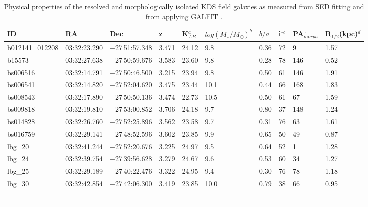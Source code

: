 \documentclass[fleqn,usenatbib]{mnras}
\begin{document}
\begin{table*}
\centering
\begin{threeparttable}
\caption{Physical properties of the resolved and morphologically isolated KDS field galaxies as measured from SED fitting and from applying {\scriptsize GALFIT} \protect\citep{Peng2010_galfit}.}
\label{tab:phys-props}
\begin{tabular}{llllllllll}


 \hline
ID              & RA       & Dec       & z     & K$_{AB}^{a}$     & $log(M_{\star}/M_{\odot})^{b}$ & $b/a$ & i$^{\circ}$$^{c}$ & PA$_{morph}^{\circ}$ & R$_{1/2}$(kpc)$^{d}$ \\
 \hline
b012141\_012208 & 03:32:23.290 & $-$27:51:57.348 & 3.471        & 24.12  & 9.8 & 0.36        & 72        & 9     & 1.57      \\
b15573          & 03:32:27.638 & $-$27:50:59.676 & 3.583        & 23.60   & 9.8  & 0.28        & 78        & 146   & 0.52      \\
bs006516        & 03:32:14.791 & $-$27:50:46.500 & 3.215        & 23.94  & 9.8 & 0.50         & 61        & 146   & 1.91      \\
bs006541        & 03:32:14.820 & $-$27:52:04.620 & 3.475       & 23.44  & 10.1  & 0.44        & 66        & 168   & 1.83      \\
bs008543        & 03:32:17.890 & $-$27:50:50.136 & 3.474        & 22.73  & 10.5 & 0.50         & 61        & 67    & 1.59      \\
bs009818        & 03:32:19.810 & $-$27:53:00.852 & 3.706        & 24.18  & 9.7  & 0.80         & 37        & 148   & 1.24      \\
bs014828        & 03:32:26.760 & $-$27:52:25.896 & 3.562        & 23.58  & 9.7  & 0.31        & 76        & 63    & 1.61      \\
bs016759        & 03:32:29.141 & $-$27:48:52.596 & 3.602       & 23.85  & 9.9   & 0.65        & 50        & 49    & 0.87      \\
lbg\_20         & 03:32:41.244 & $-$27:52:20.676 & 3.225        & 24.97  & 9.5  & 0.64        & 52        & 1     & 1.28      \\
lbg\_24         & 03:32:39.754 & $-$27:39:56.628 & 3.279       & 24.67  & 9.6   & 0.53        & 60        & 34    & 1.27      \\
lbg\_25         & 03:32:29.189 & $-$27:40:22.476 & 3.322        & 24.95  & 9.4  & 0.30         & 76        & 78    & 1.18      \\
lbg\_30         & 03:32:42.854 & $-$27:42:06.300 & 3.419        & 23.85  & 10.0  & 0.79         & 38        & 66    & 0.95      \\
$$
\end{tabular}
\end{threeparttable}
\end{table*}
\end{document}
